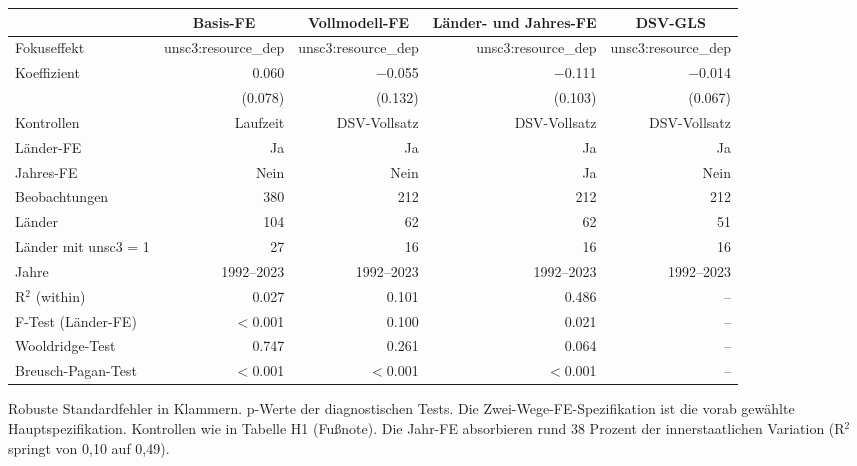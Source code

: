 \begingroup
\scriptsize
\setlength{\tabcolsep}{4pt}
\begin{center}
\begin{tabular}{l r r r r}
\toprule
& \multicolumn{1}{c}{Basis-FE} & \multicolumn{1}{c}{Vollmodell-FE} & \multicolumn{1}{c}{L\"ander- und Jahres-FE} & \multicolumn{1}{c}{DSV-GLS} \\
\midrule
Fokuseffekt & unsc3:resource\_dep & unsc3:resource\_dep & unsc3:resource\_dep & unsc3:resource\_dep \\
Koeffizient & 0.060 & $-$0.055 & $-$0.111 & $-$0.014 \\
& (0.078) & (0.132) & (0.103) & (0.067) \\
\midrule
Kontrollen & Laufzeit & DSV-Vollsatz & DSV-Vollsatz & DSV-Vollsatz \\
L\"ander-FE & Ja & Ja & Ja & Ja \\
Jahres-FE & Nein & Nein & Ja & Nein \\
\midrule
Beobachtungen & 380 & 212 & 212 & 212 \\
L\"ander & 104 & 62 & 62 & 51 \\
L\"ander mit unsc3 = 1 & 27 & 16 & 16 & 16 \\
Jahre & 1992--2023 & 1992--2023 & 1992--2023 & 1992--2023 \\
\midrule
R$^2$ (within) & 0.027 & 0.101 & 0.486 & -- \\
F-Test (L\"ander-FE) & $<$0.001 & 0.100 & 0.021 & -- \\
Wooldridge-Test & 0.747 & 0.261 & 0.064 & -- \\
Breusch-Pagan-Test & $<$0.001 & $<$0.001 & $<$0.001 & -- \\
\bottomrule
\end{tabular}
\label{tab:h2_modellvergleich}
\end{center}
\noindent\footnotesize Robuste Standardfehler in Klammern. p-Werte der diagnostischen Tests. Die Zwei-Wege-FE-Spezifikation ist die vorab gew\"ahlte Hauptspezifikation. Kontrollen wie in Tabelle H1 (Fu\ss note). Die Jahr-FE absorbieren rund 38 Prozent der innerstaatlichen Variation (R$^2$ springt von 0{,}10 auf 0{,}49).\par
\endgroup
